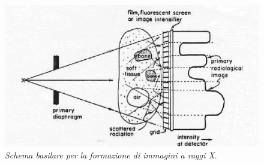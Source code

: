 \begin{figure}[H]
\centering
\includegraphics[scale=0.7]{Immagini/radiografia.png}
\caption{\label{fig:radiografia} \textit{Schema basilare per la formazione di immagini a raggi X}.}
\end{figure}
